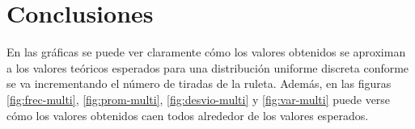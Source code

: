 \documentclass{article}
\begin{document}
\section{Conclusiones}

En las gráficas se puede ver claramente cómo los valores obtenidos se aproximan a los valores teóricos esperados para una distribución uniforme discreta conforme se va incrementando el número de tiradas de la ruleta. Además, en las figuras \ref{fig:frec-multi}, \ref{fig:prom-multi}, \ref{fig:desvio-multi} y \ref{fig:var-multi} puede verse cómo los valores obtenidos caen todos alrededor de los valores esperados.



\end{document}
